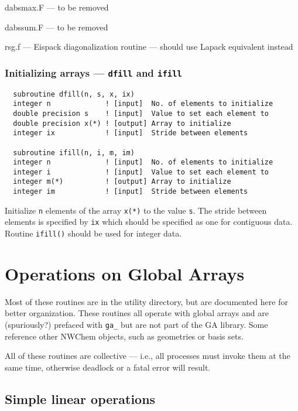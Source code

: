 dabsmax.F --- to be removed

dabssum.F --- to be removed

rsg.f --- Eispack diagonalization routine --- should use Lapack
equivalent instead


\subsubsection{Initializing arrays --- {\tt dfill} and {\tt ifill}}

\begin{verbatim}
  subroutine dfill(n, s, x, ix)
  integer n             ! [input]  No. of elements to initialize
  double precision s    ! [input]  Value to set each element to
  double precision x(*) ! [output] Array to initialize
  integer ix            ! [input]  Stride between elements

  subroutine ifill(n, i, m, im)
  integer n             ! [input]  No. of elements to initialize
  integer i             ! [input]  Value to set each element to
  integer m(*)          ! [output] Array to initialize
  integer im            ! [input]  Stride between elements
\end{verbatim}

Initialize \verb+n+ elements of the array \verb+x(*)+ to the value
\verb+s+.  The stride between elements is specified by \verb+ix+ which
should be specified as one for contiguous data.  Routine
\verb+ifill()+ should be used for integer data.


\section{Operations on Global Arrays}

Most of these routines are in the utility directory, but are
documented here for better organization.  These routines all operate
with global arrays and are (spuriously?)  prefaced with \verb+ga_+ but
are not part of the GA library.  Some reference other NWChem objects,
such as geometries or basis sets.

All of these routines are collective --- i.e., all processes must
invoke them at the same time, otherwise deadlock or a fatal error will
result.

\subsection{Simple linear operations}

